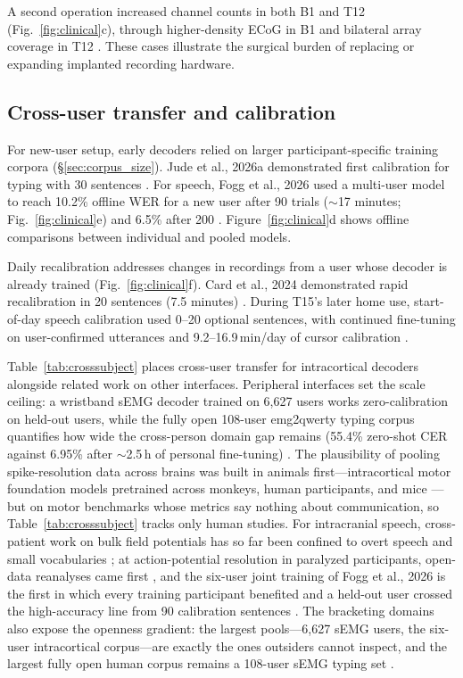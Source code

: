 \documentclass[11pt]{article}
\begin{document}
A second operation increased channel counts in both B1 and T12
(Fig.~\ref{fig:clinical}c), through higher-density ECoG in B1 and
bilateral array coverage in T12
\cite{moses2021, willett2023, yoon2026, brosler2026}. These cases illustrate
the surgical burden of replacing or expanding implanted recording
hardware.

\subsection{Cross-user transfer and calibration}
\label{sec:calibration}

For new-user setup, early decoders relied on larger participant-specific
training corpora (\S\ref{sec:corpus_size}). Jude et al., 2026a
demonstrated first calibration for typing with 30 sentences
\cite{jude2026typing}. For speech, Fogg et al., 2026 used a multi-user
model to reach 10.2\% offline WER for a new user after 90 trials
($\sim$17 minutes; Fig.~\ref{fig:clinical}e) and 6.5\% after 200
\cite{fogg2026}. Figure~\ref{fig:clinical}d shows offline comparisons
between individual and pooled models.

Daily recalibration addresses changes in recordings from a user whose
decoder is already trained (Fig.~\ref{fig:clinical}f). Card et al., 2024
demonstrated rapid recalibration in 20 sentences (7.5 minutes)
\cite{card2024}. During T15's later home use, start-of-day speech
calibration used 0--20 optional sentences, with continued fine-tuning on
user-confirmed utterances and 9.2--16.9\,min/day of cursor calibration
\cite{card2026}.

Table~\ref{tab:crosssubject} places cross-user transfer for intracortical
decoders alongside related work on other interfaces. Peripheral interfaces set the scale
ceiling: a wristband sEMG decoder trained on 6{,}627 users works
zero-calibration on held-out users, while the fully open 108-user
emg2qwerty typing corpus quantifies how wide the cross-person domain
gap remains (55.4\% zero-shot CER against 6.95\% after $\sim$2.5\,h of
personal fine-tuning) \cite{kaifosh2025, sivakumar2024}. The
plausibility of pooling spike-resolution data across brains was built
in animals first---intracortical motor foundation models pretrained
across monkeys, human participants, and mice
\cite{azabou2023, ye2023, ye2025, zhang2025ned, fang2026}---but on motor
benchmarks whose metrics say nothing about communication, so
Table~\ref{tab:crosssubject} tracks only human studies. For
intracranial speech, cross-patient work on bulk field potentials has
so far been confined to overt speech and small vocabularies
\cite{makin2020, singh2025, spalding2026}; at action-potential
resolution in paralyzed participants, open-data reanalyses came first
\cite{boccato2026, bit2026}, and the six-user joint training of Fogg et
al., 2026 is the first in which every training participant benefited
and a held-out user crossed the high-accuracy line from 90 calibration
sentences \cite{fogg2026}. The bracketing domains also expose the
openness gradient: the largest pools---6{,}627 sEMG users, the
six-user intracortical corpus---are exactly the ones outsiders cannot
inspect, and the largest fully open human corpus remains a 108-user
sEMG typing set \cite{fogg2026, kaifosh2025, sivakumar2024}.
\end{document}
